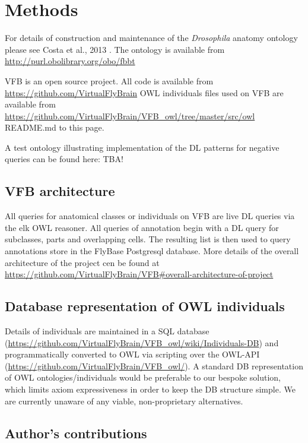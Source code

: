 \documentclass[runningheads,a4paper]{llncs}
\begin{document}
\section{Methods}

For details of construction and maintenance of the \textit{Drosophila}
anatomy ontology please see Costa et al., 2013 \cite{Costa2013}. The
ontology is available from \url{http://purl.obolibrary.org/obo/fbbt}

VFB is an open source project.  All code is available from
\url{https://github.com/VirtualFlyBrain}
OWL individuals files used on VFB are available from
\url{https://github.com/VirtualFlyBrain/VFB_owl/tree/master/src/owl} %
README.md to this page.

A test ontology illustrating implementation of the DL patterns for
negative queries can be found here: TBA!

\subsection{VFB architecture}

All queries for anatomical classes or individuals on VFB are live DL
queries via the elk OWL reasoner.  All queries of annotation begin
with a DL query for subclasses, parts and overlapping cells.  The
resulting list is then used to query annotations store in the FlyBase
Postgresql database.  More details of the overall architecture of the
project cen be found at
\url{https://github.com/VirtualFlyBrain/VFB#overall-architecture-of-project}


\subsection{Database representation of OWL individuals}

Details of individuals are maintained in a SQL database
(\url{https://github.com/VirtualFlyBrain/VFB_owl/wiki/Individuals-DB})
and programmatically converted to OWL via scripting over the OWL-API
(\url{https://github.com/VirtualFlyBrain/VFB_owl/}).  A standard DB
representation of OWL ontologies/individuals would be preferable to
our bespoke solution, which limits axiom expressiveness in order to
keep the DB structure simple.  We are currently unaware of any viable,
non-proprietary alternatives.

\subsection*{Author's contributions}
\end{document}
